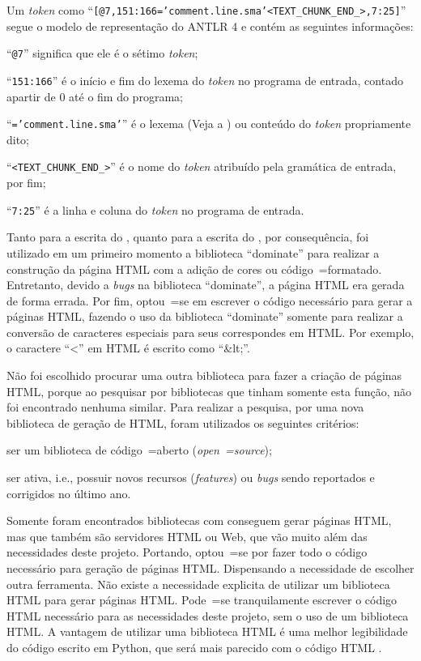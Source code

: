 Um \textit{token} como ``\texttt{[@7,151:166='comment.line.sma'<TEXT_CHUNK_END_>,7:25]}'' segue o modelo de representação do ANTLR 4 \cite{antlrBookTerrentParr} e
contém as seguintes informações:
\begin{inparaenum}[1)]
\item ``\texttt{@7}'' significa que ele é o sétimo \textit{token};
\item ``\texttt{151:166}'' é o início e
fim do lexema do \textit{token} no programa de entrada,
contado apartir de 0 até o fim do programa;
\item ``\texttt{='comment.line.sma'}'' é o lexema (Veja a ) ou
conteúdo do \textit{token} propriamente dito;
\item ``\texttt{<TEXT_CHUNK_END_>}'' é o nome do \textit{token} atribuído pela gramática de entrada,
por fim;
\item ``\texttt{7:25}'' é a linha e
coluna do \textit{token} no programa de entrada.
\end{inparaenum}%

Tanto para a escrita do ,
quanto para a escrita do ,
por consequência,
foi utilizado em um primeiro momento a biblioteca ``dominate'' para realizar a construção da página HTML com a adição de cores ou
código~=formatado. Entretanto,
devido a \textit{bugs} na biblioteca ``dominate'',
a página HTML era gerada de forma errada.
Por fim,
optou~=se em escrever o código necessário para gerar a páginas HTML,
fazendo o uso da biblioteca ``dominate'' somente para realizar a conversão de caracteres especiais para seus correspondes em HTML.
Por exemplo,
o caractere ``<'' em HTML é escrito como ``\&lt;''.

Não foi escolhido procurar uma outra biblioteca para fazer a criação de páginas HTML,
porque ao pesquisar por bibliotecas que tinham somente esta função,
não foi encontrado nenhuma similar.
Para realizar a pesquisa,
por uma nova biblioteca de geração de HTML,
foram utilizados os seguintes critérios:
\begin{inparaenum}[1)]
\item ser um biblioteca de código~=aberto (\textit{open~=source});
\item ser ativa,
i.e.,
possuir novos recursos (\textit{features}) ou
\textit{bugs} sendo reportados e
corrigidos no último ano.
\end{inparaenum}%

Somente foram encontrados bibliotecas com  conseguem gerar páginas HTML,
mas que também são servidores HTML ou
Web,
que vão muito além das necessidades deste projeto.
Portando,
optou~=se por fazer todo o código necessário para geração de páginas HTML.
Dispensando a necessidade de escolher outra ferramenta.
Não existe a necessidade explicita de utilizar um biblioteca HTML para gerar páginas HTML.
Pode~=se tranquilamente escrever o código HTML necessário para as necessidades deste projeto,
sem o uso de um biblioteca HTML.
A vantagem de utilizar uma biblioteca HTML é uma melhor legibilidade do código escrito em Python,
que será mais parecido com o código HTML \cite{webDevelopmentWithDjango}.

